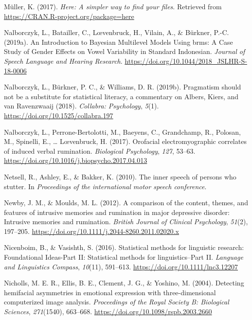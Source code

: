 \documentclass[a4paper,12pt,twoside,openright,oldfontcommands]{memoir}
\begin{document}
\leavevmode\hypertarget{ref-R-here}{}%
Müller, K. (2017). \emph{Here: A simpler way to find your files}. Retrieved from \url{https://CRAN.R-project.org/package=here}

\leavevmode\hypertarget{ref-nalborczyk_introduction_2019}{}%
Nalborczyk, L., Batailler, C., Lœvenbruck, H., Vilain, A., \& Bürkner, P.-C. (2019a). An Introduction to Bayesian Multilevel Models Using brms: A Case Study of Gender Effects on Vowel Variability in Standard Indonesian. \emph{Journal of Speech Language and Hearing Research}. \url{https://doi.org/10.1044/2018_JSLHR-S-18-0006}

\leavevmode\hypertarget{ref-nalborczyk_pragmatism_2019}{}%
Nalborczyk, L., Bürkner, P. C., \& Williams, D. R. (2019b). Pragmatism should not be a substitute for statistical literacy, a commentary on Albers, Kiers, and van Ravenzwaaij (2018). \emph{Collabra: Psychology}, \emph{5}(1). \url{https://doi.org/10.1525/collabra.197}

\leavevmode\hypertarget{ref-nalborczyk_orofacial_2017}{}%
Nalborczyk, L., Perrone-Bertolotti, M., Baeyens, C., Grandchamp, R., Polosan, M., Spinelli, E., \ldots{} Lœvenbruck, H. (2017). Orofacial electromyographic correlates of induced verbal rumination. \emph{Biological Psychology}, \emph{127}, 53--63. \url{https://doi.org/10.1016/j.biopsycho.2017.04.013}

\leavevmode\hypertarget{ref-netsell_inner_2010}{}%
Netsell, R., Ashley, E., \& Bakker, K. (2010). The inner speech of persons who stutter. In \emph{Proceedings of the international motor speech conference}.

\leavevmode\hypertarget{ref-newby_comparison_2012}{}%
Newby, J. M., \& Moulds, M. L. (2012). A comparison of the content, themes, and features of intrusive memories and rumination in major depressive disorder: Intrusive memories and rumination. \emph{British Journal of Clinical Psychology}, \emph{51}(2), 197--205. \url{https://doi.org/10.1111/j.2044-8260.2011.02020.x}

\leavevmode\hypertarget{ref-nicenboim_statistical_2016}{}%
Nicenboim, B., \& Vasishth, S. (2016). Statistical methods for linguistic research: Foundational Ideas-Part II: Statistical methods for linguistics--Part II. \emph{Language and Linguistics Compass}, \emph{10}(11), 591--613. \url{https://doi.org/10.1111/lnc3.12207}

\leavevmode\hypertarget{ref-nicholls_detecting_2004}{}%
Nicholls, M. E. R., Ellis, B. E., Clement, J. G., \& Yoshino, M. (2004). Detecting hemifacial asymmetries in emotional expression with three-dimensional computerized image analysis. \emph{Proceedings of the Royal Society B: Biological Sciences}, \emph{271}(1540), 663--668. \url{https://doi.org/10.1098/rspb.2003.2660}
\end{document}
